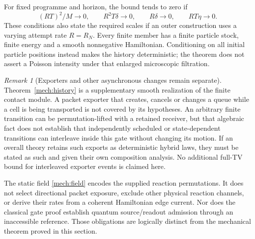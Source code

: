 \documentclass[11pt]{article}
\theoremstyle{definition}\newtheorem{definition}[theorem]{Definition}
\theoremstyle{remark}\newtheorem{remark}[theorem]{Remark}
\begin{document}
For fixed programme and horizon, the bound tends to zero if
\[
 (RT)^2/M\to0,\qquad
 R^2T\delta\to0,\qquad R\delta\to0,\qquad RT\eta\to0.
\]
These conditions also state the required scales if an outer construction
uses a varying attempt rate $R=R_N$. Every finite member has a finite
particle stock, finite energy and a smooth nonnegative Hamiltonian.
Conditioning on all initial particle positions instead makes the history
deterministic; the theorem does not assert a Poisson intensity under that
enlarged microscopic filtration.

\begin{remark}[Exporters and other asynchronous changes remain separate]
\label{mech:scope}
Theorem~\ref{mech:history} is a supplementary smooth realization of the
finite contact module. A packet exporter that creates, cancels or changes
a queue while a cell is being transported is not covered by its hypotheses.
An arbitrary finite transition can be permutation-lifted with a retained
receiver, but that algebraic fact does not establish that independently
scheduled or state-dependent transitions can interleave inside this gate
without changing its motion. If an overall theory retains such exports
as deterministic hybrid laws, they must be stated as such and given their
own composition analysis. No additional full-TV bound for interleaved
exporter events is claimed here.

The static field \eqref{mech:field} encodes the supplied reaction
permutations. It does not select directional packet exposure, exclude
other physical reaction channels, or derive their rates from a coherent
Hamiltonian edge current. Nor does the classical gate proof establish
quantum source/readout admission through an inaccessible reference.
Those obligations are logically distinct from the mechanical theorem
proved in this section.
\end{remark}
\end{document}
